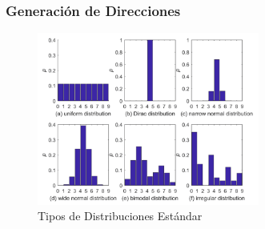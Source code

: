 \documentclass[11pt]{beamer}
\begin{document}
	\begin{frame}
		\frametitle{Generación de Direcciones}
		\begin{figure}[h]
			\centering
			\includegraphics[width=0.65\textwidth]{test_distributions.png}
			\caption{Tipos de Distribuciones Estándar}
			\label{fig:uni_normal_dist}
		\end{figure}
	\end{frame}
\end{document}
